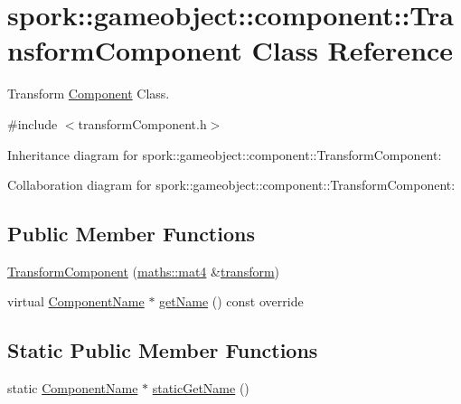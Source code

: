 \hypertarget{classspork_1_1gameobject_1_1component_1_1_transform_component}{}\section{spork\+:\+:gameobject\+:\+:component\+:\+:Transform\+Component Class Reference}
\label{classspork_1_1gameobject_1_1component_1_1_transform_component}


Transform \hyperlink{classspork_1_1gameobject_1_1component_1_1_component}{Component} Class.  




{\ttfamily \#include $<$transform\+Component.\+h$>$}



Inheritance diagram for spork\+:\+:gameobject\+:\+:component\+:\+:Transform\+Component\+:


Collaboration diagram for spork\+:\+:gameobject\+:\+:component\+:\+:Transform\+Component\+:
\subsection*{Public Member Functions}
\begin{DoxyCompactItemize}
\item 
\hyperlink{classspork_1_1gameobject_1_1component_1_1_transform_component_a44807997fbb8f6a76899bcb4d465c9c2}{Transform\+Component} (\hyperlink{structspork_1_1maths_1_1mat4}{maths\+::mat4} \&\hyperlink{classspork_1_1gameobject_1_1component_1_1_transform_component_a326265123b0804f6e947cb0dd16f5492}{transform})
\item 
virtual \hyperlink{structspork_1_1gameobject_1_1component_1_1_component_name}{Component\+Name} $\ast$ \hyperlink{classspork_1_1gameobject_1_1component_1_1_transform_component_a36194e25608601dbf7c6def7f988ecc1}{get\+Name} () const override
\end{DoxyCompactItemize}
\subsection*{Static Public Member Functions}
\begin{DoxyCompactItemize}
\item 
static \hyperlink{structspork_1_1gameobject_1_1component_1_1_component_name}{Component\+Name} $\ast$ \hyperlink{classspork_1_1gameobject_1_1component_1_1_transform_component_a6ba87bfd4c64228b6a5dd7648ba5c3d9}{static\+Get\+Name} ()
\end{DoxyCompactItemize}
